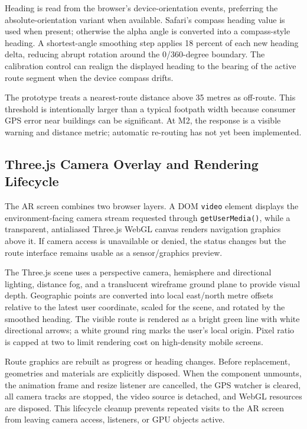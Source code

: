 \documentclass[11pt]{article}
\begin{document}
Heading is read from the browser's device-orientation events, preferring the absolute-orientation variant when available. Safari's compass heading value is used when present; otherwise the alpha angle is converted into a compass-style heading. A shortest-angle smoothing step applies 18 percent of each new heading delta, reducing abrupt rotation around the 0/360-degree boundary. The calibration control can realign the displayed heading to the bearing of the active route segment when the device compass drifts.

The prototype treats a nearest-route distance above 35 metres as off-route. This threshold is intentionally larger than a typical footpath width because consumer GPS error near buildings can be significant. At M2, the response is a visible warning and distance metric; automatic re-routing has not yet been implemented.

\subsection*{Three.js Camera Overlay and Rendering Lifecycle}

The AR screen combines two browser layers. A DOM \texttt{video} element displays the environment-facing camera stream requested through \texttt{getUserMedia()}, while a transparent, antialiased Three.js WebGL canvas renders navigation graphics above it. If camera access is unavailable or denied, the status changes but the route interface remains usable as a sensor/graphics preview.

The Three.js scene uses a perspective camera, hemisphere and directional lighting, distance fog, and a translucent wireframe ground plane to provide visual depth. Geographic points are converted into local east/north metre offsets relative to the latest user coordinate, scaled for the scene, and rotated by the smoothed heading. The visible route is rendered as a bright green line with white directional arrows; a white ground ring marks the user's local origin. Pixel ratio is capped at two to limit rendering cost on high-density mobile screens.

Route graphics are rebuilt as progress or heading changes. Before replacement, geometries and materials are explicitly disposed. When the component unmounts, the animation frame and resize listener are cancelled, the GPS watcher is cleared, all camera tracks are stopped, the video source is detached, and WebGL resources are disposed. This lifecycle cleanup prevents repeated visits to the AR screen from leaving camera access, listeners, or GPU objects active.
\end{document}

